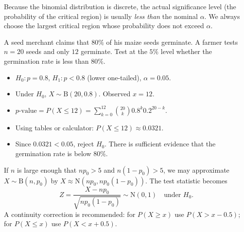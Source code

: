 \documentclass[11pt]{article}
\begin{document}
\begin{attention}
Because the binomial distribution is discrete, the actual significance level (the probability of the critical region) is usually \emph{less than} the nominal $\alpha$. We always choose the largest critical region whose probability does not exceed $\alpha$.
\end{attention}

\begin{exemplebox}
A seed merchant claims that $80\%$ of his maize seeds germinate. A farmer tests $n = 20$ seeds and only $12$ germinate. Test at the $5\%$ level whether the germination rate is less than $80\%$.
\begin{itemize}
\item $H_0 : p = 0.8$, $H_1 : p < 0.8$ (lower one-tailed), $\alpha = 0.05$.
\item Under $H_0$, $X \sim \mathrm{B}(20, 0.8)$. Observed $x = 12$.
\item $p\text{-value} = P(X \leq 12) = \sum_{k=0}^{12} \binom{20}{k} 0.8^k 0.2^{20-k}$.
\item Using tables or calculator: $P(X \leq 12) \approx 0.0321$.
\item Since $0.0321 < 0.05$, reject $H_0$. There is sufficient evidence that the germination rate is below $80\%$.
\end{itemize}
\end{exemplebox}

\begin{propriete}
If $n$ is large enough that $np_0 > 5$ and $n(1-p_0) > 5$, we may approximate $X \sim \mathrm{B}(n, p_0)$ by $X \approx \mathrm{N}(np_0, np_0(1-p_0))$. The test statistic becomes
\[ Z = \frac{X - np_0}{\sqrt{np_0(1-p_0)}} \sim \mathrm{N}(0,1) \quad\text{under } H_0. \]
A continuity correction is recommended: for $P(X \geq x)$ use $P(X > x - 0.5)$; for $P(X \leq x)$ use $P(X < x + 0.5)$.
\end{propriete}
\end{document}
